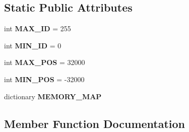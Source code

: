 \subsection*{Static Public Attributes}
\begin{DoxyCompactItemize}
\item 
int {\bfseries M\+A\+X\+\_\+\+ID} = 255\hypertarget{classkondoServoLib_1_1b3mCtrl_1_1B3mClass_a92c5da3a7168857ea770078574132290}{}\label{classkondoServoLib_1_1b3mCtrl_1_1B3mClass_a92c5da3a7168857ea770078574132290}

\item 
int {\bfseries M\+I\+N\+\_\+\+ID} = 0\hypertarget{classkondoServoLib_1_1b3mCtrl_1_1B3mClass_a3503c1076faba33710746d3618c57e0d}{}\label{classkondoServoLib_1_1b3mCtrl_1_1B3mClass_a3503c1076faba33710746d3618c57e0d}

\item 
int {\bfseries M\+A\+X\+\_\+\+P\+OS} = 32000\hypertarget{classkondoServoLib_1_1b3mCtrl_1_1B3mClass_a70d773fe1e2ccfb6a955110140cf0a59}{}\label{classkondoServoLib_1_1b3mCtrl_1_1B3mClass_a70d773fe1e2ccfb6a955110140cf0a59}

\item 
int {\bfseries M\+I\+N\+\_\+\+P\+OS} = -\/32000\hypertarget{classkondoServoLib_1_1b3mCtrl_1_1B3mClass_a29f228cf17efb8c5f48180dc485c5cae}{}\label{classkondoServoLib_1_1b3mCtrl_1_1B3mClass_a29f228cf17efb8c5f48180dc485c5cae}

\item 
dictionary {\bfseries M\+E\+M\+O\+R\+Y\+\_\+\+M\+AP}\hypertarget{classkondoServoLib_1_1b3mCtrl_1_1B3mClass_a71883622fe29913c6f899129c39681b4}{}\label{classkondoServoLib_1_1b3mCtrl_1_1B3mClass_a71883622fe29913c6f899129c39681b4}

\end{DoxyCompactItemize}


\subsection{Member Function Documentation}
